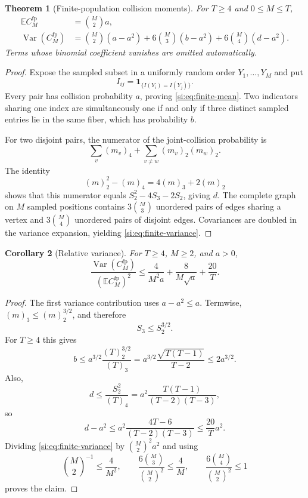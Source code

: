 \documentclass[9pt,twoside]{pnas-new}
\newtheorem{theorem}{Theorem}
\newtheorem{corollary}[theorem]{Corollary}
\theoremstyle{definition}
\theoremstyle{remark}
\begin{document}
\begin{theorem}[Finite-population collision moments]
\label{si:thm:finite-moments}
For $T\ge4$ and $0\le M\le T$,
\begin{align}
 \mathbb E C_M^{\mathrm{fp}}
 &=\binom M2a,
 \label{si:eq:finite-mean}\\
 \operatorname{Var}(C_M^{\mathrm{fp}})
 &=\binom M2(a-a^2)
   +6\binom M3(b-a^2)
   +6\binom M4(d-a^2).
 \label{si:eq:finite-variance}
\end{align}
Terms whose binomial coefficient vanishes are omitted automatically.
\end{theorem}

\begin{proof}
Expose the sampled subset in a uniformly random order $Y_1,\ldots,Y_M$ and put
\[
 I_{ij}=\mathbf 1_{\{I(Y_i)=I(Y_j)\}}.
\]
Every pair has collision probability $a$, proving \eqref{si:eq:finite-mean}.  Two indicators sharing one index are simultaneously one if and only if three distinct sampled entries lie in the same fiber, which has probability $b$.

For two disjoint pairs, the numerator of the joint-collision probability is
\[
 \sum_v(m_v)_4+
 \sum_{v\ne w}(m_v)_2(m_w)_2.
\]
The identity
\[
 (m)_2^2-(m)_4=4(m)_3+2(m)_2
\]
shows that this numerator equals $S_2^2-4S_3-2S_2$, giving $d$.  The complete graph on $M$ sampled positions contains $3\binom M3$ unordered pairs of edges sharing a vertex and $3\binom M4$ unordered pairs of disjoint edges.  Covariances are doubled in the variance expansion, yielding \eqref{si:eq:finite-variance}.
\end{proof}

\begin{corollary}[Relative variance]
\label{si:cor:finite-relative-variance}
For $T\ge4$, $M\ge2$, and $a>0$,
\begin{equation}
 \frac{\operatorname{Var}(C_M^{\mathrm{fp}})}
 {(\mathbb E C_M^{\mathrm{fp}})^2}
 \le
 \frac4{M^2a}
 +\frac8{M\sqrt a}
 +\frac{20}{T}.
 \label{si:eq:finite-relative-variance}
\end{equation}
\end{corollary}

\begin{proof}
The first variance contribution uses $a-a^2\le a$.  Termwise,
$(m)_3\le (m)_2^{3/2}$, and therefore
\[
 S_3\le S_2^{3/2}.
\]
For $T\ge4$ this gives
\[
 b\le a^{3/2}\frac{(T)_2^{3/2}}{(T)_3}
 =a^{3/2}\frac{\sqrt{T(T-1)}}{T-2}
 \le2a^{3/2}.
\]
Also,
\[
 d\le\frac{S_2^2}{(T)_4}
 =a^2\frac{T(T-1)}{(T-2)(T-3)},
\]
so
\[
 d-a^2
 \le a^2\frac{4T-6}{(T-2)(T-3)}
 \le\frac{20}{T}a^2.
\]
Dividing \eqref{si:eq:finite-variance} by
$\binom M2^2a^2$ and using
\[
 \binom M2^{-1}\le\frac4{M^2},
 \qquad
 \frac{6\binom M3}{\binom M2^2}\le\frac4M,
 \qquad
 \frac{6\binom M4}{\binom M2^2}\le1
\]
proves the claim.
\end{proof}
\end{document}
